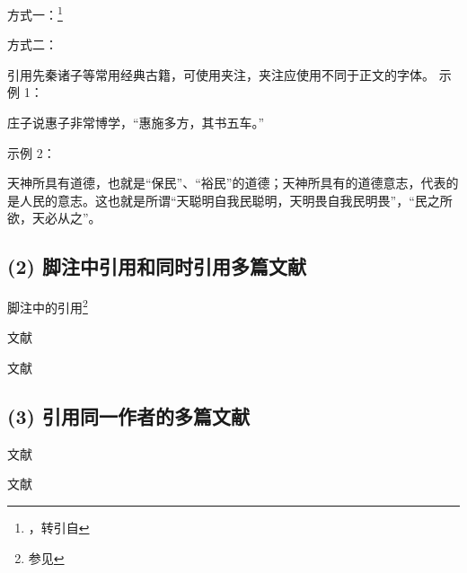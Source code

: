 \documentclass[twoside]{article}
\begin{document}
方式一：\footnote{，转引自}

方式二：



引用先秦诸子等常用经典古籍，可使用夹注，夹注应使用不同于正文的字体。
 示例 1：

 庄子说惠子非常博学，“惠施多方，其书五车。”

 示例 2：

 天神所具有道德，也就是“保民”、“裕民”的道德；天神所具有的道德意志，代表的是人民的意志。这也就是所谓“天聪明自我民聪明，天明畏自我民明畏”，“民之所 欲，天必从之”。


\newpage
\subsection*{(2) 脚注中引用和同时引用多篇文献}

脚注中的引用\footnote{参见}

文献

文献



\newpage
\subsection*{(3) 引用同一作者的多篇文献}

文献

文献

\nocite{*}

\newpage
{
    \printbibliography

}

    
\end{document}
